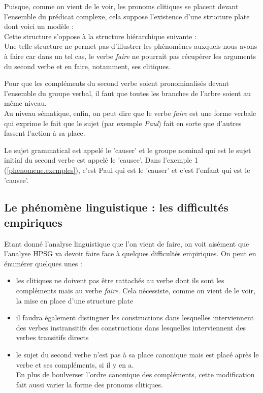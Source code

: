 Puisque, comme on vient de le voir, les pronoms clitiques se placent devant l'ensemble du prédicat complexe, cela suppose l'existence d'une structure plate dont voici un modèle : \\


Cette structure s'oppose à la structure hiérarchique suivante :\\


Une telle structure ne permet pas d'illustrer les phénomènes auxquels nous avons à faire car dans un tel cas, le verbe \emph{faire} ne pourrait pas récupérer les arguments du second verbe et en faire, notamment, ses clitiques.

Pour que les compléments du second verbe soient pronominalisés devant l'ensemble du groupe verbal, il faut que toutes les branches de l'arbre soient au même niveau.\\

Au niveau sématique, enfin, on peut dire que le verbe \emph{faire} est une forme verbale qui exprime le fait que le sujet (par exemple \emph{Paul}) fait en sorte que d'autres fassent l'action à sa place.

Le sujet grammatical est appelé le 'causer' et le groupe nominal qui est le sujet initial du second verbe est appelé le 'causee'.
Dans l'exemple 1 (\autoref{phenomene.exemples}), c'est Paul qui est le 'causer' et c'est l'enfant qui est le 'causee'.

\newpage

\subsection{Le phénomène linguistique : les difficultés empiriques}

Etant donné l'analyse linguistique que l'on vient de faire, on voit aisément que l'analyse HPSG va devoir faire face à quelques difficultés empiriques.
On peut en énumérer quelques unes :\\

\begin{itemize}
  \item les clitiques ne doivent pas être rattachés au verbe dont ils sont les compléments mais au verbe \emph{faire}.
    Cela nécessiste, comme on vient de le voir, la mise en place d'une structure plate
  \item il faudra également distinguer les constructions dans lesquelles interviennent des verbes instransitifs des constructions dans lesquelles interviennent des verbes transitifs directs
  \item le sujet du second verbe n'est pas à sa place canonique mais est placé après le verbe et ses compléments, si il y en a.\\
    En plus de boulverser l'ordre canonique des compléments, cette modification fait aussi varier la forme des pronoms clitiques.
\end{itemize}

